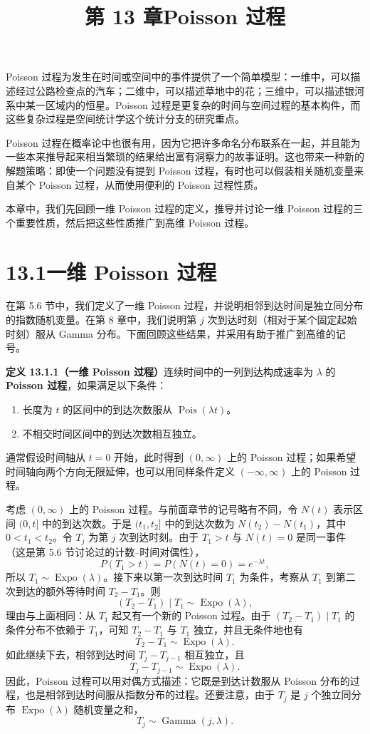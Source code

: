 \documentclass[UTF8,12pt,a4paper,fontset=fandol]{ctexart}
\title{第 13 章\quad Poisson 过程}
\author{}
\date{}
\begin{document}
\maketitle

Poisson 过程为发生在时间或空间中的事件提供了一个简单模型：一维中，可以描述经过公路检查点的汽车；二维中，可以描述草地中的花；三维中，可以描述银河系中某一区域内的恒星。Poisson 过程是更复杂的时间与空间过程的基本构件，而这些复杂过程是空间统计学这个统计分支的研究重点。

Poisson 过程在概率论中也很有用，因为它把许多命名分布联系在一起，并且能为一些本来推导起来相当繁琐的结果给出富有洞察力的故事证明。这也带来一种新的解题策略：即使一个问题没有提到 Poisson 过程，有时也可以假装相关随机变量来自某个 Poisson 过程，从而使用便利的 Poisson 过程性质。

本章中，我们先回顾一维 Poisson 过程的定义，推导并讨论一维 Poisson 过程的三个重要性质，然后把这些性质推广到高维 Poisson 过程。

\section*{13.1\quad 一维 Poisson 过程}

在第 5.6 节中，我们定义了一维 Poisson 过程，并说明相邻到达时间是独立同分布的指数随机变量。在第 8 章中，我们说明第 $j$ 次到达时刻（相对于某个固定起始时刻）服从 Gamma 分布。下面回顾这些结果，并采用有助于推广到高维的记号。

\noindent\textbf{定义 13.1.1（一维 Poisson 过程）}\quad 连续时间中的一列到达构成速率为 $\lambda$ 的 \textbf{Poisson 过程}，如果满足以下条件：
\begin{enumerate}
  \item 长度为 $t$ 的区间中的到达次数服从 $\operatorname{Pois}(\lambda t)$。
  \item 不相交时间区间中的到达次数相互独立。
\end{enumerate}

通常假设时间轴从 $t=0$ 开始，此时得到 $(0,\infty)$ 上的 Poisson 过程；如果希望时间轴向两个方向无限延伸，也可以用同样条件定义 $(-\infty,\infty)$ 上的 Poisson 过程。

考虑 $(0,\infty)$ 上的 Poisson 过程。与前面章节的记号略有不同，令 $N(t)$ 表示区间 $(0,t]$ 中的到达次数。于是 $(t_1,t_2]$ 中的到达次数为 $N(t_2)-N(t_1)$，其中 $0<t_1<t_2$。令 $T_j$ 为第 $j$ 次到达时刻。由于 $T_1>t$ 与 $N(t)=0$ 是同一事件（这是第 5.6 节讨论过的计数--时间对偶性），
\[
  P(T_1>t)=P(N(t)=0)=e^{-\lambda t},
\]
所以 $T_1\sim\operatorname{Expo}(\lambda)$。接下来以第一次到达时间 $T_1$ 为条件，考察从 $T_1$ 到第二次到达的额外等待时间 $T_2-T_1$。则
\[
  (T_2-T_1)\mid T_1 \sim \operatorname{Expo}(\lambda),
\]
理由与上面相同：从 $T_1$ 起又有一个新的 Poisson 过程。由于 $(T_2-T_1)\mid T_1$ 的条件分布不依赖于 $T_1$，可知 $T_2-T_1$ 与 $T_1$ 独立，并且无条件地也有
\[
  T_2-T_1\sim\operatorname{Expo}(\lambda).
\]
如此继续下去，相邻到达时间 $T_j-T_{j-1}$ 相互独立，且
\[
  T_j-T_{j-1}\sim\operatorname{Expo}(\lambda).
\]
因此，Poisson 过程可以用对偶方式描述：它既是到达计数服从 Poisson 分布的过程，也是相邻到达时间服从指数分布的过程。还要注意，由于 $T_j$ 是 $j$ 个独立同分布 $\operatorname{Expo}(\lambda)$ 随机变量之和，
\[
  T_j\sim\operatorname{Gamma}(j,\lambda).
\]
\end{document}
